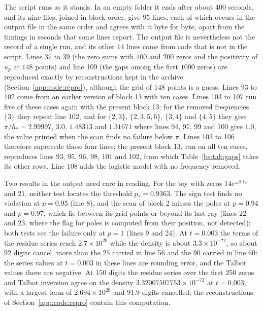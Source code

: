 The script runs as it stands. In an empty folder it ends after about $400$ seconds, and its nine files, joined in block order, give $95$ lines, each of which occurs in the output file in the same order and agrees with it byte for byte, apart from the timings in seconds that some lines report. The output file is nevertheless not the record of a single run, and its other $14$ lines come from code that is not in the script. Lines 37 to 39 (the zero sums with $100$ and $200$ zeros and the positivity of $u_p$ at $148$ points) and line 109 (the gaps among the first $1000$ zeros) are reproduced exactly by reconstructions kept in the archive (Section~\ref{app:code:repro}), although the grid of $148$ points is a guess. Lines 93 to 102 come from an earlier version of block 13 with ten cases. Lines 103 to 107 run five of these cases again with the present block 13: for the removed frequencies $\{3\}$ they repeat line 102, and for $\{2,3\}$, $\{2,3,5,6\}$, $\{3,4\}$ and $\{4,5\}$ they give $\pi/h_*=2.99997$, $3.0$, $1.48313$ and $1.31671$ where lines 94, 97, 99 and 100 give $1.0$, the value printed when the scan finds no failure below $\pi$. Lines 103 to 106 therefore supersede those four lines; the present block 13, run on all ten cases, reproduces lines 93, 95, 96, 98, 101 and 102, from which Table~\ref{bs:tab:gaps} takes its other rows. Line 108 adds the logistic model with no frequency removed.

Two results in the output need care in reading. For the toy with zeros $14e^{\pm0.1i}$ and $21$, neither test locates the threshold $p_*=0.9363$. The sign test finds no violation at $p=0.95$ (line 8), and the scan of block 2 misses the poles at $p=0.94$ and $p=0.97$, which lie between its grid points or beyond its last ray (lines 22 and 23, where the flag for poles is computed from their position, not detected); both tests see the failure only at $p=1$ (lines 9 and 24). At $t=0.003$ the terms of the residue series reach $2.7\times10^{20}$ while the density is about $3.3\times10^{-72}$, so about $92$ digits cancel, more than the $25$ carried in line 56 and the $90$ carried in line 60: the series values at $t=0.003$ in these lines are rounding error, and the Talbot values there are negative. At $150$ digits the residue series over the first $250$ zeros and Talbot inversion agree on the density $3.32007507753\times10^{-72}$ at $t=0.003$, with a largest term of $2.694\times10^{20}$ and $91.9$ digits cancelled; the reconstructions of Section~\ref{app:code:repro} contain this computation.
